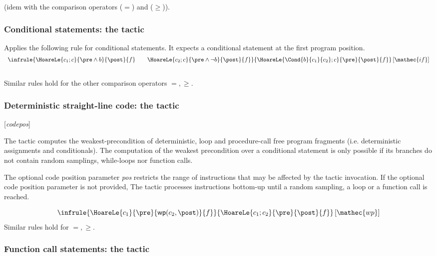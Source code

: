 (idem with the comparison operators ($=$) and ($\geq$)).


\subsubsection*{Conditional statements: the  tactic}
Applies the following rule for conditional statements. It expects a
conditional statement at the first program position.
\begin{displaymath}
\begin{array}{c}
  \infrule{
    \HoareLe{c_1;c}{\pre \land b}{\post}{f}\qquad
    \HoareLe{c_2;c}{\pre \land \neg b}{\post}{f}
  }{
    \HoareLe{\Cond{b}{c_1}{c_2};c}{\pre}{\post}{f}
  }\left[\mathec{if} \right] 
\\[4ex]
\end{array}
\end{displaymath}
Similar rules hold for the other comparison operators $=,\geq$.

\subsubsection*{Deterministic straight-line code: the  tactic}


\Syntax {} [\textit{codepos}]

\Description The  tactic computes the weakest-precondition of
deterministic, loop and procedure-call free program fragments
(i.e. deterministic assignments and conditionals).   
The computation of the weakest precondition over a
conditional statement is only possible if its branches do not
contain random samplings, while-loops nor function calls.

The optional code position parameter \textit{pos} restricts the range
of instructions that may be affected by the tactic invocation. 
%
If the optional code position parameter is not provided, The tactic
processes instructions bottom-up until a random sampling, a loop or a
function call is reached.

\begin{displaymath}
  \infrule{
    \HoareLe{c_1}{\pre }{\mathsf{wp}(c_2,\post)}{f}
  }{
    \HoareLe{c_1;c_2}{\pre}{\post}{f}
  }\left[\mathec{wp} \right] 
\end{displaymath}
Similar rules hold for $=,\geq$.

\subsubsection*{Function call statements: the  tactic}

